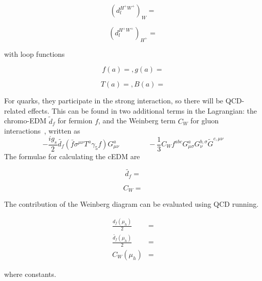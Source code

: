 \begin{equation}\label{eq:EDM-chargedScalar-Wloop}
	(d^{H^{+}W^{+}}_{l})_{W} = 
\end{equation}

\begin{equation}\label{eq:EDM-chargedScalar-cHloop}
	(d^{H^{+}W^{+}}_{l})_{H^{+}} = 
\end{equation}

with loop functions

\begin{equation}
	f(a)= , g(a)=
\end{equation}

\begin{equation}
	T(a)= , B(a)=
\end{equation}

For quarks, they participate in the strong interaction, so there will be QCD-related effects.
This can be found in two additional terms in the Lagrangian: 
the chromo-EDM \(\tilde{d}_{f} \) for fermion \(f \), and the Weinberg term \(C_{W} \) for gluon interactions~\cite{Weinberg89}, written as
\begin{equation}
  -\frac{i g_{s}}{2}\tilde{d_{f}}\left(\bar{f}\sigma^{\mu\nu}T^{a}\gamma_{5}f\right)G^{a}_{\mu\nu}\quad \qquad \quad -\frac{1}{3}C_Wf^{abc}G^{a}_{\mu\sigma}G^{b,\sigma}_{\nu}\tilde{G}^{c,\mu\nu}
\end{equation}
The formulae for calculating the cEDM are

\begin{equation}
	\tilde{d_{f}} = 
\end{equation}

\begin{equation}
	C_{W} = 
\end{equation}

The contribution of the Weinberg diagram can be evaluated using QCD running.

\begin{align}
	\frac{d_{f}(\mu_{h})}{2} &= \\
	\frac{\tilde{d_{f}}(\mu_{h})}{2} &= \\
	C_{W}(\mu_{h}) &= 
\end{align}

where constants.